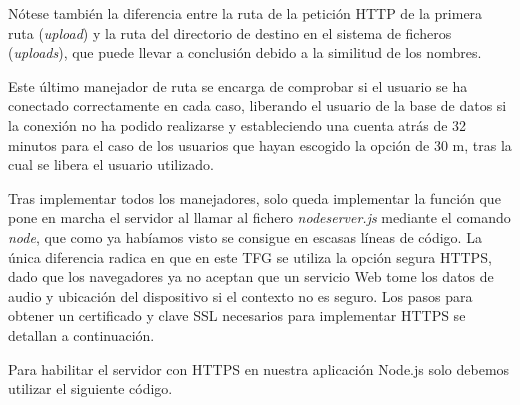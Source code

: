 Nótese también la diferencia entre la ruta de la petición HTTP de la primera ruta (\emph{upload}) y la ruta del directorio de destino en el sistema de ficheros (\emph{uploads}), que puede llevar a conclusión debido a la similitud de los nombres.

Este último manejador de ruta se encarga de comprobar si el usuario se ha conectado correctamente en cada caso, liberando el usuario de la base de datos si la conexión no ha podido realizarse y estableciendo una cuenta atrás de 32 minutos para el caso de los usuarios que hayan escogido la opción de 30 m, tras la cual se libera el usuario utilizado.


Tras implementar todos los manejadores, solo queda implementar la función que pone en marcha el servidor al llamar al fichero \emph{nodeserver.js} mediante el comando \emph{node}, que como ya habíamos visto se consigue en escasas líneas de código. La única diferencia radica en que en este TFG se utiliza la opción segura HTTPS, dado que los navegadores ya no aceptan que un servicio Web tome los datos de audio y ubicación del dispositivo si el contexto no es seguro. Los pasos para obtener un certificado y clave \acrshort{SSL} necesarios para implementar HTTPS se detallan a continuación.

Para habilitar el servidor con HTTPS en nuestra aplicación Node.js solo debemos utilizar el siguiente código.


